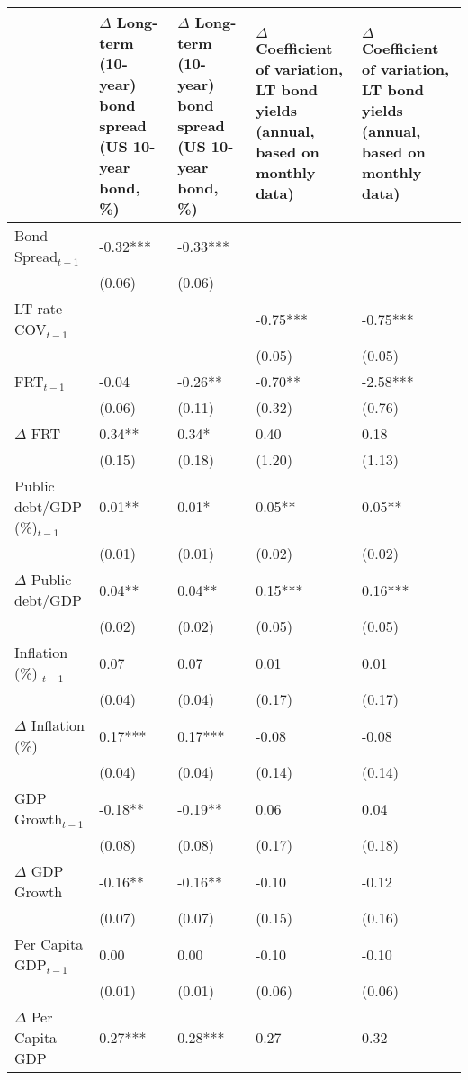\begingroup\tiny
\begin{tabular}{lp{3cm}p{3cm}p{3cm}p{3cm}}
  \hline
 & $\Delta$ Long-term (10-year) bond spread (US 10-year bond, \%) & $\Delta$ Long-term (10-year) bond spread (US 10-year bond, \%) & $\Delta$ Coefficient of variation, LT bond yields (annual, based on monthly data) & $\Delta$ Coefficient of variation, LT bond yields (annual, based on monthly data) \\ 
  \hline
Bond Spread$_{t-1}$ & -0.32*** & -0.33*** &  &  \\ 
   & (0.06) & (0.06) &  &  \\ 
  LT rate COV$_{t-1}$ &  &  & -0.75*** & -0.75*** \\ 
   &  &  & (0.05) & (0.05) \\ 
  FRT$_{t-1}$ & -0.04 & -0.26** & -0.70** & -2.58*** \\ 
   & (0.06) & (0.11) & (0.32) & (0.76) \\ 
  $\Delta$ FRT & 0.34** & 0.34* & 0.40 & 0.18 \\ 
   & (0.15) & (0.18) & (1.20) & (1.13) \\ 
  Public debt/GDP (\%)$_{t-1}$ & 0.01** & 0.01* & 0.05** & 0.05** \\ 
   & (0.01) & (0.01) & (0.02) & (0.02) \\ 
  $\Delta$ Public debt/GDP & 0.04** & 0.04** & 0.15*** & 0.16*** \\ 
   & (0.02) & (0.02) & (0.05) & (0.05) \\ 
  Inflation (\%) $_{t-1}$ & 0.07 & 0.07 & 0.01 & 0.01 \\ 
   & (0.04) & (0.04) & (0.17) & (0.17) \\ 
  $\Delta$ Inflation (\%) & 0.17*** & 0.17*** & -0.08 & -0.08 \\ 
   & (0.04) & (0.04) & (0.14) & (0.14) \\ 
  GDP Growth$_{t-1}$ & -0.18** & -0.19** & 0.06 & 0.04 \\ 
   & (0.08) & (0.08) & (0.17) & (0.18) \\ 
  $\Delta$ GDP Growth & -0.16** & -0.16** & -0.10 & -0.12 \\ 
   & (0.07) & (0.07) & (0.15) & (0.16) \\ 
  Per Capita GDP$_{t-1}$ & 0.00 & 0.00 & -0.10 & -0.10 \\ 
   & (0.01) & (0.01) & (0.06) & (0.06) \\ 
  $\Delta$ Per Capita GDP & 0.27*** & 0.28*** & 0.27 & 0.32 \\ 

\end{tabular}
